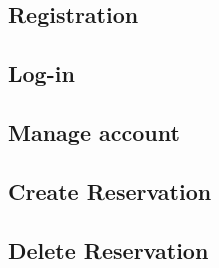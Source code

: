 \newpage
\subsection{Registration}
  

\newpage
\subsection{Log-in}
  

\newpage
\subsection{Manage account}
  

\newpage
\subsection{Create Reservation}
  
  
\newpage
\subsection{Delete Reservation}
  

